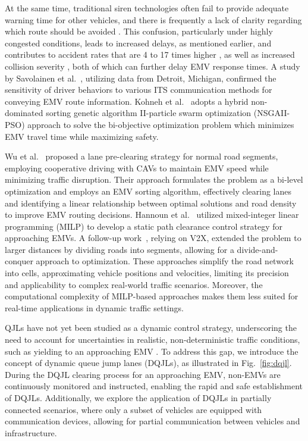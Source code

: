 At the same time, traditional siren technologies often fail to provide adequate warning time for other vehicles, and there is frequently a lack of clarity regarding which route should be avoided \cite{chen2021adaptive,you2021mrd,liu2021aligning}. This confusion, particularly under highly congested conditions, leads to increased delays, as mentioned earlier, and contributes to accident rates that are 4 to 17 times higher \cite{Buchenscheit2009AVE,cheng2016identification}, as well as increased collision severity \cite{Yasmin2012Effects,cheng2016random,li2019novel}, both of which can further delay EMV response times. A study by Savolainen et al.~\cite{Savolainen2010Effects}, utilizing data from Detroit, Michigan, confirmed the sensitivity of driver behaviors to various ITS communication methods for conveying EMV route information. 
Kohneh et al.~\cite{Kohneh2024twoways} adopts a hybrid non-dominated sorting genetic algorithm II-particle swarm optimization (NSGAII-PSO) approach to solve the bi-objective optimization problem which minimizes EMV travel time while maximizing safety.

Wu et al.~\cite{WU2020preclearing} proposed a lane pre-clearing strategy for normal road segments, employing cooperative driving with CAVs to maintain EMV speed while minimizing traffic disruption. Their approach formulates the problem as a bi-level optimization and employs an EMV sorting algorithm, effectively clearing lanes and identifying a linear relationship between optimal solutions and road density to improve EMV routing decisions. Hannoun et al.~\cite{Hannoun2019Facilitating} utilized mixed-integer linear programming (MILP) to develop a static path clearance control strategy for approaching EMVs. A follow-up work~\cite{hannoun2021sequential}, relying on V2X, extended the problem to larger distances by dividing roads into segments, allowing for a divide-and-conquer approach to optimization. These approaches simplify the road network into cells, approximating vehicle positions and velocities, limiting its precision and applicability to complex real-world traffic scenarios. Moreover, the computational complexity of MILP-based approaches makes them less suited for real-time applications in dynamic traffic settings. 

QJLs have not yet been studied as a dynamic control strategy, underscoring the need to account for uncertainties in realistic, non-deterministic traffic conditions, such as yielding to an approaching EMV \cite{liu2021auto,you2022megan,liu2022retrieve}. To address this gap, we introduce the concept of dynamic queue jump lanes (DQJLs), as illustrated in Fig.~\ref{fig:dqjl}. During the DQJL clearing process for an approaching EMV, non-EMVs are continuously monitored and instructed, enabling the rapid and safe establishment of DQJLs. Additionally, we explore the application of DQJLs in partially connected scenarios, where only a subset of vehicles are equipped with communication devices, allowing for partial communication between vehicles and infrastructure.

